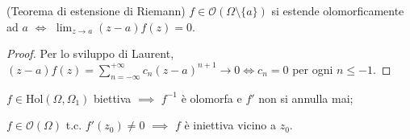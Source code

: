 \begin{cor}
  (Teorema di estensione di Riemann) $f \in \mathcal{O}(\Omega \setminus \{a\})$ si estende olomorficamente ad $a$ $\Leftrightarrow$ $\displaystyle \lim_{z \rightarrow a} (z-a)f(z)=0$.
\end{cor}

\begin{proof}
  Per lo sviluppo di Laurent, $\displaystyle (z-a)f(z)=\sum_{n=-\infty}^{+\infty} c_n(z-a)^{n+1} \rightarrow 0 \Leftrightarrow c_n=0$ per ogni $n \le -1$.
\end{proof}

\begin{thm} \label{biolo}
  \begin{nlist}
    \item $f \in \text{Hol}(\Omega, \Omega_1)$ biettiva $\implies$ $f^{-1}$ è olomorfa e $f'$ non si annulla mai;
    \item $f \in \mathcal{O}(\Omega)$ t.c. $f'(z_0) \not=0$ $\implies$ $f$ è iniettiva vicino a $z_0$.
  \end{nlist}
\end{thm}

